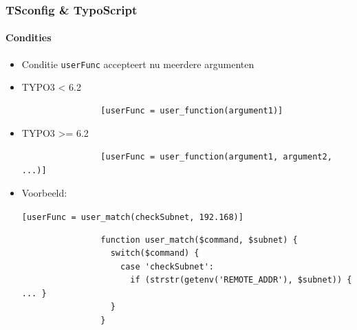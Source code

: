 \begin{frame}[fragile]
	\frametitle{TSconfig \& TypoScript}
	\framesubtitle{Condities}

	\begin{itemize}
		\item Conditie \texttt{userFunc} accepteert nu meerdere argumenten 

		\item TYPO3 < 6.2
			\begin{lstlisting}
				[userFunc = user_function(argument1)]
			\end{lstlisting}

		\item TYPO3 >= 6.2
			\begin{lstlisting}
				[userFunc = user_function(argument1, argument2, ...)]
			\end{lstlisting}

		\item Voorbeeld:

			\lstinline![userFunc = user_match(checkSubnet, 192.168)]!

			\begin{lstlisting}
				function user_match($command, $subnet) {
				  switch($command) {
				    case 'checkSubnet':
				      if (strstr(getenv('REMOTE_ADDR'), $subnet)) { ... }
				  }
				}
			\end{lstlisting}

	\end{itemize}

\end{frame}


